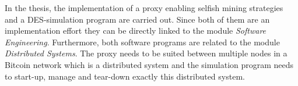 \documentclass{scrartcl}
\begin{document}
In the thesis, the implementation of a proxy enabling selfish mining strategies and a DES-simulation program are carried out. Since both of them are an implementation effort they can be directly linked to the module \textit{Software Engineering}. Furthermore, both software programs are related to the module \textit{Distributed Systems}. The proxy needs to be suited between multiple nodes in a Bitcoin network which is a distributed system and the simulation program needs to start-up, manage and tear-down exactly this distributed system.


\end{document}
